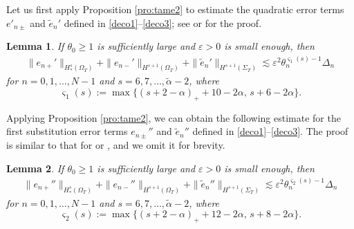 \documentclass[twoside,11pt]{article}
\numberwithin{equation}{section}
\newtheorem{lemma}{Lemma}[section]
\begin{document}
Let us first apply Proposition \ref{pro:tame2} to estimate the quadratic error terms $e'_{n\pm }$ and $\tilde{e}_{n}'$ defined in \eqref{deco1}--\eqref{deco3}; see \cite[Lemma 4.6]{TW21MR4201624} or \cite[Lemma 4.5]{TW22cMR4506578} for the proof.
\begin{lemma}\label{lem:quad}
	If $\theta_0\geq 1$ is sufficiently large and $\varepsilon>0$ is small enough, then
	\begin{align}\nonumber %
		\|e_{n+}'\|_{H_*^s(\Omega_{T})}+\|e_{n-}'\|_{H^{s+1}(\Omega_{T})}+ \| \tilde{e}_{n}' \|_{H^{s+1}(\Sigma_{T})}
		\lesssim \varepsilon^2 \theta_{n}^{\varsigma_1(s)-1}\varDelta_{n}
	\end{align}
	for $n=0,1,\ldots,{N}-1$  and $s=6,7,\ldots,\widetilde{\alpha}-2 $,
	where $$\varsigma_1(s):=\max\{(s+2-{\alpha })_++10-2{\alpha },\,s+6-2{\alpha } \}.$$
\end{lemma}



Applying Proposition \ref{pro:tame2}, we can obtain the following estimate for the first substitution error terms $e_{n\pm}''$ and $\tilde{e}_{n}''$ defined in \eqref{deco1}--\eqref{deco3}. The proof is similar to that for \cite[Lemma 4.7]{TW21MR4201624} or \cite[Lemma 4.6]{TW22cMR4506578}, and  we omit it for brevity.
\begin{lemma} \label{lem:1st}
	If $\theta_0\geq 1$ is sufficiently large and $\varepsilon>0$ is small enough, then
	\begin{align}  \nonumber %
		\|e_{n+}''\|_{H_*^s(\Omega_{T})}+\|e_{n-}''\|_{H^{s+1}(\Omega_{T})}+ \|\tilde{e}_{n}''\|_{H^{s+1}(\Sigma_{T})}
		\lesssim \varepsilon^2 \theta_n^{\varsigma_2(s)-1}\varDelta_{n}
	\end{align}
	for $n=0,1,\ldots,{N}-1$  and $s=6,7,\ldots,\widetilde{\alpha}-2 $,	
	where $$\varsigma_2(s):=\max\{(s+2-{\alpha })_++12-2{\alpha },\, s+8-2{\alpha } \}.$$
\end{lemma}
\end{document}
